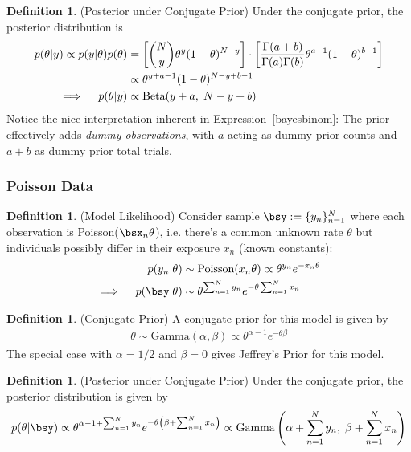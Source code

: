\documentclass[12pt]{article}
\theoremstyle{plain}
\theoremstyle{definition}
\newtheorem{defn}[thm]{Definition}
\theoremstyle{remark}
\newcommand{\sumnN}{\sum^N_{n=1}}
\newcommand{\nN}{_{n=1}^N}
\begin{document}
\begin{defn}(Posterior under Conjugate Prior)
Under the conjugate prior, the posterior distribution is
\begin{align}
    p(\theta | y)
    \propto  p(y|\theta) p(\theta)
    &=
    \left[
    \binom{N}{y}
    \theta^y (1-\theta)^{N-y}
    \right]
    \cdot
    \left[
    \frac{\Gamma(a + b)}{\Gamma(a)\Gamma(b)}
    \theta^{a-1}(1-\theta)^{b-1}
    \right]
    \notag
    \\
    &\propto
    \theta^{y+a -1} (1-\theta)^{N-y+b-1}
    \label{bayesbinom}
    \\
    \implies\quad
    p(\theta | y)
    &\propto
    \text{Beta}(y+a, \; N-y+b)
    \notag
\end{align}
Notice the nice interpretation inherent in Expression~\ref{bayesbinom}:
The prior effectively adds \emph{dummy observations}, with $a$ acting as
dummy prior counts and $a+b$ as dummy prior total trials.
\end{defn}

\subsubsection{Poisson Data}

\begin{defn}(Model Likelihood)
Consider sample $\bsy:=\{y_n\}\nN$ where each observation is
Poisson($\bsx_n\theta$), i.e. there's a common unknown rate $\theta$ but
individuals possibly differ in their exposure $x_n$ (known constants):
\begin{align*}
  p(y_n|\theta)
  &\sim
  \text{Poisson}(x_n\theta)
  \propto
  \theta^{y_n} e^{-x_n\theta}
  \\
  \implies\quad
  p(\bsy|\theta)
  &\sim
  \theta^{\sumnN y_n} e^{-\theta\sumnN x_n}
\end{align*}
\end{defn}

\begin{defn}(Conjugate Prior)
A conjugate prior for this model is given by
\begin{align*}
  \theta \sim \text{Gamma}(\alpha, \beta)
  \propto
  \theta^{\alpha - 1} e^{-\theta\beta}
\end{align*}
The special case with $\alpha=1/2$ and $\beta=0$ gives Jeffrey's Prior
for this model.
\end{defn}


\begin{defn}(Posterior under Conjugate Prior)
Under the conjugate prior, the posterior distribution is given by
\begin{align*}
  p(\theta | \bsy)
  \propto
  \theta^{\alpha-1+\sumnN y_n}
  e^{- \theta\left(\beta+\sumnN x_n\right)}
  \propto
  \text{Gamma}\left(\alpha+\sumnN y_n, \;  \beta +\sumnN x_n\right)
\end{align*}
\end{defn}
\end{document}

